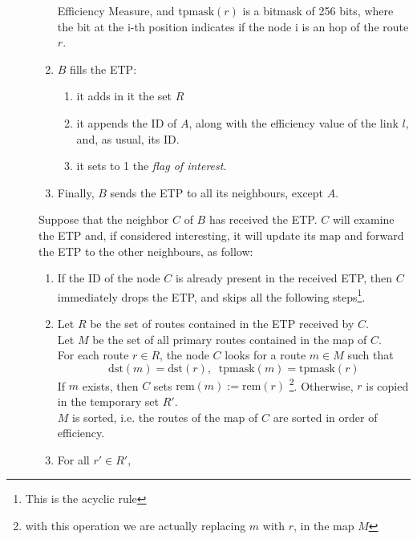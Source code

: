 \documentclass[a4paper]{article}
\newcommand{\T}[1]{\textrm{#1}}
\begin{document}
\begin{description}
\begin{enumerate}
			Efficiency Measure, and $\T{tpmask}(r)$ is a bitmask of 256
			bits, where the bit at the i-th position indicates if
			the node i is an hop of the route $r$.
		\item $B$ fills the ETP: 
			\begin{enumerate}
				\item it adds in it the set $R$
		\item it appends the ID of $A$, along with the efficiency
			value of the link $l$, and, as usual, its ID.
		\item it sets to 1 the \emph{flag of interest}.
			\end{enumerate}
		\item Finally, $B$ sends the ETP to all its neighbours, except $A$.
		\end{enumerate}
		\label{ETPrule1}
		Suppose that the neighbor $C$ of $B$ has received the ETP. $C$
		will examine the ETP and, if considered interesting, it 
	will update its map and forward the ETP to the other neighbours, as
		follow:
		\begin{enumerate}
		\item If the ID of the node $C$ is already present in the
			received ETP, then $C$ immediately drops the ETP, and
			skips all the following steps\footnote{This is the acyclic
			rule}.
		\item Let $R$ be the set of routes contained in the
			ETP received by $C$.\\
			Let $M$ be the set of all primary routes contained in the map of $C$.\\
		For each route $r\in R$, the node $C$ looks for 
		a route $m\in M$ such that 
		\[\T{dst}(m)=\T{dst}(r),\;\;\T{tpmask}(m)=\T{tpmask}(r)\]
		If $m$ exists, then $C$ sets $\T{rem}(m):=\T{rem}(r)$
		\footnote{with this operation we are actually replacing $m$
		with $r$, in the map $M$}.
		Otherwise, $r$ is copied in the temporary set $R'$.\\
		$M$ is sorted, i.e. the routes of the map of $C$ are sorted in
		order of efficiency.
	\item For all $r' \in R'$,
\end{enumerate}
\end{description}
\end{document}
